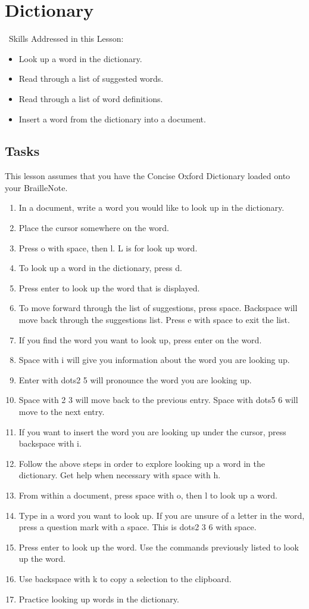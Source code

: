 \documentclass[10pt,letterpaper,twoside]{report}
\begin{document}
{{{\section{ Dictionary}
\
Skills Addressed in this Lesson:
\begin{itemize}
	\item Look up a word in the dictionary.
	\item Read through a list of suggested words.
	\item Read through a list of word definitions.
	\item Insert a word from the dictionary into a document.
\end{itemize}
\subsection{Tasks}
This lesson assumes that you have the Concise Oxford Dictionary loaded onto your BrailleNote.
\begin{enumerate}
	\item In a document, write a word you would like to look up in the dictionary.
	\item Place the cursor somewhere on the word.
	\item Press o with space, then l.  L is for look up word.
	\item To look up a word in the dictionary, press d.
	\item Press enter to look up the word that is displayed.
	\item To move forward through the list of suggestions, press space.  Backspace will move back through the suggestions list.  Press e with space to exit the list.
	\item If you find the word you want to look up, press enter on the word.
	\item Space with i will give you information about the word you are looking up.
	\item Enter with dots2 5 will pronounce the word you are looking up.
	\item Space with 2 3 will move back to the previous entry.  Space with dots5 6 will move to the next entry.
	\item If you want to insert the word you are looking up under the cursor, press backspace with i.
	\item Follow the above steps in order to explore looking up a word in the dictionary.  Get help when necessary with space with h.
	\item From within a document, press space with o, then l to look up a word.
	\item Type in a word you want to look up.  If you are unsure of a letter in the word, press a question mark with a space.  This is dots2 3 6 with space.
	\item Press enter to look up the word.  Use the commands previously listed to look up the word.
	\item Use backspace with k to copy a selection to the clipboard.
	\item Practice looking up words in the dictionary.
\end{enumerate}
\clearpage
}}}
\end{document}
